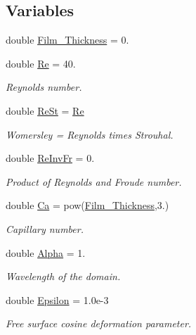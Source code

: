 \subsection*{Variables}
\begin{DoxyCompactItemize}
\item 
double \hyperlink{namespaceGlobal__Physical__Variables_a4d1da0a125f6044733e121f0f3d958ca}{Film\+\_\+\+Thickness} = 0.
\item 
double \hyperlink{namespaceGlobal__Physical__Variables_ab814e627d2eb5bc50318879d19ab16b9}{Re} = 40.
\begin{DoxyCompactList}\small\item\em Reynolds number. \end{DoxyCompactList}\item 
double \hyperlink{namespaceGlobal__Physical__Variables_a085ee4bf968ffdd01a41b8c41864f907}{Re\+St} = \hyperlink{namespaceGlobal__Physical__Variables_ab814e627d2eb5bc50318879d19ab16b9}{Re}
\begin{DoxyCompactList}\small\item\em Womersley = Reynolds times Strouhal. \end{DoxyCompactList}\item 
double \hyperlink{namespaceGlobal__Physical__Variables_aa6286f02b476912dd7550eced538331a}{Re\+Inv\+Fr} = 0.
\begin{DoxyCompactList}\small\item\em Product of Reynolds and Froude number. \end{DoxyCompactList}\item 
double \hyperlink{namespaceGlobal__Physical__Variables_a8b32b93d2e546f9375ec418474107838}{Ca} = pow(\hyperlink{namespaceGlobal__Physical__Variables_a4d1da0a125f6044733e121f0f3d958ca}{Film\+\_\+\+Thickness},3.)
\begin{DoxyCompactList}\small\item\em Capillary number. \end{DoxyCompactList}\item 
double \hyperlink{namespaceGlobal__Physical__Variables_aa2e802ee7cc8e1ac900ba94c3ce86eb7}{Alpha} = 1.
\begin{DoxyCompactList}\small\item\em Wavelength of the domain. \end{DoxyCompactList}\item 
double \hyperlink{namespaceGlobal__Physical__Variables_a28f21de3d342b1dab2fa0be362c6a944}{Epsilon} = 1.\+0e-\/3
\begin{DoxyCompactList}\small\item\em Free surface cosine deformation parameter. \end{DoxyCompactList}\item 

\end{DoxyCompactItemize}
